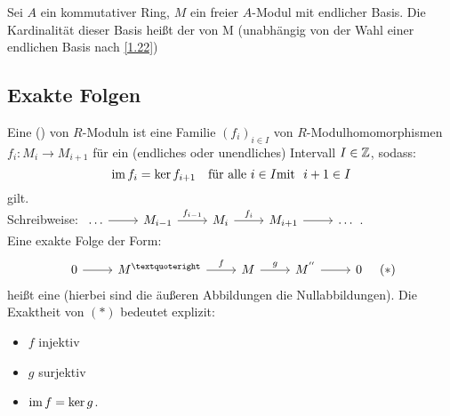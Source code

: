 \begin{df}\label{1.23}
	Sei $A$ ein kommutativer Ring, $M$ ein freier $A$-Modul mit endlicher Basis. Die Kardinalität dieser Basis heißt der  von M (unabhängig von der Wahl einer endlichen Basis nach \ref{1.22})
\end{df}
\newpage
\subsection{Exakte Folgen}
\begin{df}\label{2.1}
	Eine  () von $R$-Moduln ist eine Familie $(f_i)_{i \in I}$ von $R$-Modulhomomorphismen $f_i: M_i \to M_{i+1} $ für ein (endliches oder unendliches) Intervall $I \in \mathbb{Z} $, sodass: $$ \operatorname{im} f_i = \ker f_{i+1} \quad \text{für alle } i \in I \text{mit } \ i+1 \in I $$ gilt. \\
	Schreibweise: \quad  $\begin{tikzcd}
	\ldots \arrow{r}{}& M_{i-1} \arrow{r}{f_{i-1}}& M_i \arrow{r}{f_i} & M_{i+1} \arrow{r} & \ldots
	\end{tikzcd}$.\\
	Eine exakte Folge der Form: $$\begin{tikzcd}
	0  \arrow{r} & M^{’} \arrow{r}{f} & M \arrow{r}{g} & M^{''} \arrow{r} & 0
	\end{tikzcd}  \quad (\ast) $$
	heißt eine  (hierbei sind die äußeren Abbildungen die Nullabbildungen). Die Exaktheit von $ (\ast)$ bedeutet explizit:
	\begin{itemize}
		\item $f$ injektiv
		\item $g$ surjektiv
		\item $\operatorname{im} f = \ker g $.
	\end{itemize}
\end{df}

